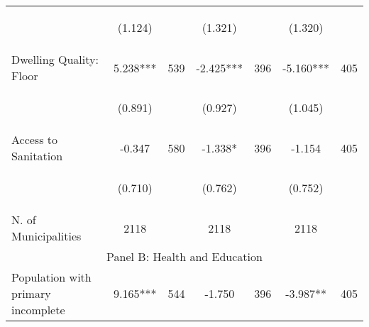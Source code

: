 \begin{tabular}{lcccccc}
\vspace{4pt} &  \begin{footnotesize}(1.124)\end{footnotesize}   & &
			    \begin{footnotesize}(1.321)\end{footnotesize}   & &
			    \begin{footnotesize}(1.320)\end{footnotesize}   &
			     \\          



Dwelling Quality: Floor   &  5.238***   &  539  &   -2.425***  &  396 &  -5.160***  &  405   \\

\vspace{4pt} &  \begin{footnotesize}(0.891)\end{footnotesize}   & &
			    \begin{footnotesize}(0.927)\end{footnotesize}   & &
			    \begin{footnotesize}(1.045)\end{footnotesize}   &
			     \\          

Access to Sanitation   &  -0.347   &  580  &   -1.338*  &  396 &  -1.154  &  405   \\

\vspace{4pt} &  \begin{footnotesize}(0.710)\end{footnotesize}   & &
			    \begin{footnotesize}(0.762)\end{footnotesize}   & &
			    \begin{footnotesize}(0.752)\end{footnotesize}   &
			     \\          

N. of Municipalities  &   2118   &  &  2118    & &  2118  &    \\

\hline		
\multicolumn{7}{c}{Panel B: Health and Education}   \\                                                          


Population with primary incomplete   &  9.165***   &  544  &   -1.750  &  396 &  -3.987**  &  405   \\



\end{tabular}
